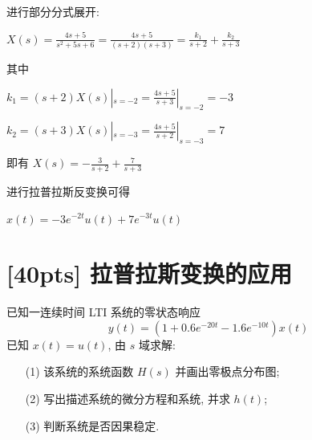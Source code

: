 \documentclass[a4paper,UTF8]{article}
\numberwithin{equation}{section}
\begin{document}
\begin{framed}
\begin{spacing}{1.5}
\begin{itemize}
        进行部分分式展开:
        
        $\displaystyle X(s) = \frac{4s+5}{s^{2}+5s+6} = \frac{4s+5}{(s+2)(s+3)} = \frac{k_1}{s + 2} + \frac{k_2}{s + 3}$
        
        其中
        
        $\displaystyle k_1 = (s+2)X(s)|_{s=-2} = \frac{4s+5}{s+3}|_{s=-2} = -3$
        
        $\displaystyle k_2 = (s+3)X(s)|_{s=-3} = \frac{4s+5}{s+2}|_{s=-3} = 7$
        
        即有 $\displaystyle X(s) = -\frac{3}{s+2} + \frac{7}{s+3}$
        
        进行拉普拉斯反变换可得
        
        $\displaystyle x(t) = -3e^{-2t}u(t) + 7e^{-3t}u(t)$
			\end{itemize}
		\end{spacing}
	\end{framed}
	
	
	
	
	\newpage
	\section{[40pts] 拉普拉斯变换的应用}
	已知一连续时间 LTI 系统的零状态响应
	$$
	y(t)=\left(1+0.6e^{-20t}-1.6e^{-10t}\right) x(t)
	$$
	已知 $x(t)=u(t)$, 由 $s$ 域求解:
	\begin{itemize}
		\item[(1)]该系统的系统函数 $H(s)$ 并画出零极点分布图;
		\item[(2)]写出描述系统的微分方程和系统, 并求 $h(t)$;
		\item[(3)]判断系统是否因果稳定.
	\end{itemize}
	
\end{document}
